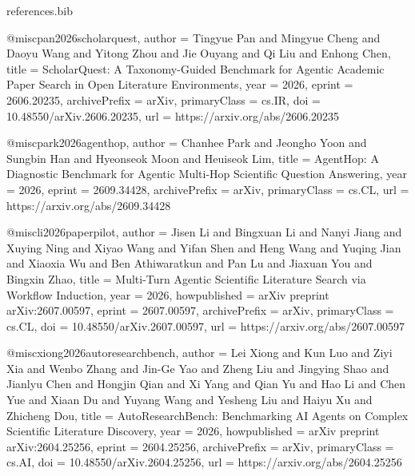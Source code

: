 \begin{filecontents*}{references.bib}


@misc{pan2026scholarquest,
  author        = {Tingyue Pan and Mingyue Cheng and Daoyu Wang and Yitong Zhou and Jie Ouyang and Qi Liu and Enhong Chen},
  title         = {{ScholarQuest: A Taxonomy-Guided Benchmark for Agentic Academic Paper Search in Open Literature Environments}},
  year          = {2026},
  eprint        = {2606.20235},
  archivePrefix = {arXiv},
  primaryClass  = {cs.IR},
  doi           = {10.48550/arXiv.2606.20235},
  url           = {https://arxiv.org/abs/2606.20235}
}

@misc{park2026agenthop,
  author        = {Chanhee Park and Jeongho Yoon and Sungbin Han and Hyeonseok Moon and Heuiseok Lim},
  title         = {{AgentHop: A Diagnostic Benchmark for Agentic Multi-Hop Scientific Question Answering}},
  year          = {2026},
  eprint        = {2609.34428},
  archivePrefix = {arXiv},
  primaryClass  = {cs.CL},
  url           = {https://arxiv.org/abs/2609.34428}
}

@misc{li2026paperpilot,
  author        = {Jisen Li and Bingxuan Li and Nanyi Jiang and Xuying Ning and Xiyao Wang and Yifan Shen and Heng Wang and Yuqing Jian and Xiaoxia Wu and Ben Athiwaratkun and Pan Lu and Jiaxuan You and Bingxin Zhao},
  title         = {{Multi-Turn Agentic Scientific Literature Search via Workflow Induction}},
  year          = {2026},
  howpublished  = {arXiv preprint arXiv:2607.00597},
  eprint        = {2607.00597},
  archivePrefix = {arXiv},
  primaryClass  = {cs.CL},
  doi           = {10.48550/arXiv.2607.00597},
  url           = {https://arxiv.org/abs/2607.00597}
}

@misc{xiong2026autoresearchbench,
  author        = {Lei Xiong and Kun Luo and Ziyi Xia and Wenbo Zhang and Jin-Ge Yao and Zheng Liu and Jingying Shao and Jianlyu Chen and Hongjin Qian and Xi Yang and Qian Yu and Hao Li and Chen Yue and Xiaan Du and Yuyang Wang and Yesheng Liu and Haiyu Xu and Zhicheng Dou},
  title         = {{AutoResearchBench: Benchmarking AI Agents on Complex Scientific Literature Discovery}},
  year          = {2026},
  howpublished  = {arXiv preprint arXiv:2604.25256},
  eprint        = {2604.25256},
  archivePrefix = {arXiv},
  primaryClass  = {cs.AI},
  doi           = {10.48550/arXiv.2604.25256},
  url           = {https://arxiv.org/abs/2604.25256}
}


\end{filecontents*}
